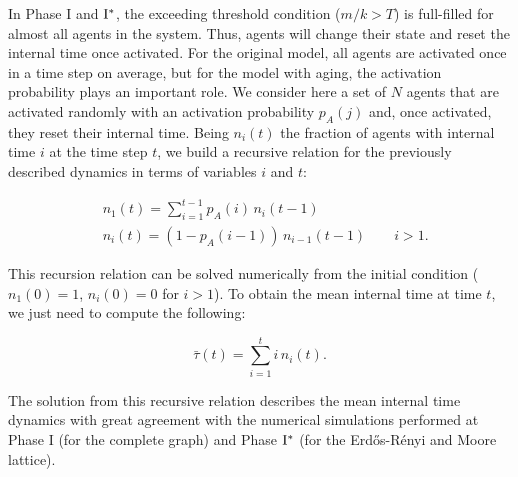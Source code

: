 
In Phase I and ${\rm I}^{*}$, the exceeding threshold condition ($m/k > T$) is full-filled for almost all agents in the system. Thus, agents will change their state and reset the internal time once activated. For the original model, all agents are activated once in a time step on average, but for the model with aging, the activation probability plays an important role. We consider here a set of $N$ agents that are activated randomly with an activation probability $p_A(j)$ and, once activated, they reset their internal time. Being $n_i(t)$ the fraction of agents with internal time $i$ at the time step $t$, we build a recursive relation for the previously described dynamics in terms of variables $i$ and $t$:

\begin{eqnarray}
     & n_1(t) = \sum_{i=1}^{t-1} p_A(i) \, n_i(t-1) \nonumber\\
     & n_i(t) = (1 - p_A(i-1) ) \, n_{i-1}(t-1)  \qquad i > 1. \label{eq:RR1}
\end{eqnarray}

This recursion relation can be solved numerically from the initial condition ($n_1(0) = 1$, $n_i(0) = 0$ for $i > 1$). To obtain the mean internal time at time $t$, we just need to compute the following:

\begin{equation}
    \label{eq:RR}
    \bar{\tau}(t) = \sum_{i=1}^{t} i \, n_i(t).
\end{equation}

The solution from this recursive relation describes the mean internal time dynamics with great agreement with the numerical simulations performed at Phase I (for the complete graph) and Phase ${\rm  I}^{*}$ (for the Erd\H{o}s-R\'enyi and Moore lattice).